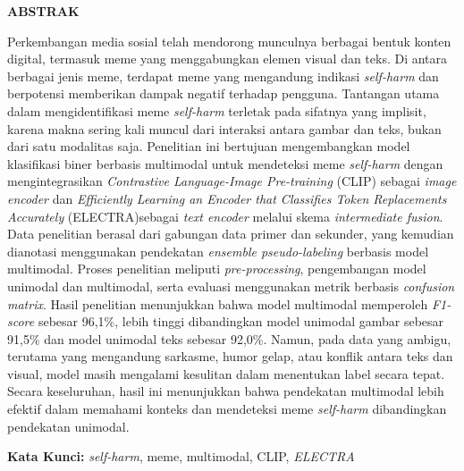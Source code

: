 \clearpage
{}%
\thispagestyle{fancy}

\begin{center}
	\large \bfseries \MakeUppercase{Abstrak}\\
	\bigskip
	
	\normalsize \normalfont \justifying \singlespacing
	Perkembangan media sosial telah mendorong munculnya berbagai bentuk konten digital, termasuk meme yang menggabungkan elemen visual dan teks. Di antara berbagai jenis meme, terdapat meme yang mengandung indikasi \textit{self-harm} dan berpotensi memberikan dampak negatif terhadap pengguna. Tantangan utama dalam mengidentifikasi meme \textit{self-harm} terletak pada sifatnya yang implisit, karena makna sering kali muncul dari interaksi antara gambar dan teks, bukan dari satu modalitas saja. Penelitian ini bertujuan mengembangkan model klasifikasi biner berbasis multimodal untuk mendeteksi meme \textit{self-harm} dengan mengintegrasikan  \textit{Contrastive Language-Image Pre-training} (CLIP) sebagai \textit{image encoder} dan \textit{Efficiently Learning an Encoder that Classifies Token Replacements Accurately} (ELECTRA)sebagai \textit{text encoder} melalui skema \textit{intermediate fusion}. Data penelitian berasal dari gabungan data primer dan sekunder, yang kemudian dianotasi menggunakan pendekatan \textit{ensemble pseudo-labeling} berbasis model multimodal. Proses penelitian meliputi \textit{pre-processing}, pengembangan model unimodal dan multimodal, serta evaluasi menggunakan metrik berbasis \textit{confusion matrix}. Hasil penelitian menunjukkan bahwa model multimodal memperoleh \textit{F1-score} sebesar 96,1\%, lebih tinggi dibandingkan model unimodal gambar sebesar 91,5\% dan model unimodal teks sebesar 92,0\%. Namun, pada data yang ambigu, terutama yang mengandung sarkasme, humor gelap, atau konflik antara teks dan visual, model masih mengalami kesulitan dalam menentukan label secara tepat. Secara keseluruhan, hasil ini menunjukkan bahwa pendekatan multimodal lebih efektif dalam memahami konteks dan mendeteksi meme \textit{self-harm} dibandingkan pendekatan unimodal.\par

    \vspace{20pt}
	\raggedright \textbf{Kata Kunci:} \textit{self-harm}, meme, multimodal, CLIP, \textit{ELECTRA}
	
	\vfill
	
\end{center}
\clearpage
